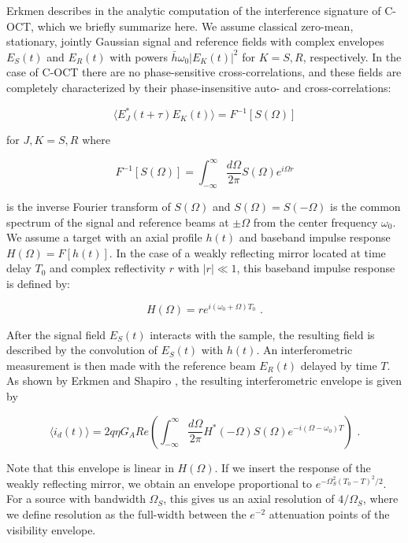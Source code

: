 Erkmen describes in \cite{erkmen-thesis} the analytic computation of the interference signature of C-OCT, which we briefly summarize here. We assume classical zero-mean, stationary, jointly Gaussian signal and reference fields with complex envelopes $E_S(t)$ and $E_R(t)$ with powers $\bar{h}\omega_0|E_K(t)|^2$ for $K = S, R$, respectively. In the case of C-OCT there are no phase-sensitive cross-correlations, and these fields are completely characterized by their phase-insensitive auto- and cross-correlations:

\begin{equation}
\langle E_J^*(t+\tau) E_K(t) \rangle = F^{-1}[S(\Omega)]
\end{equation}

for $J, K = S, R$ where

\begin{equation}
F^{-1}[S(\Omega)] = \int_{-\infty}^{\infty} \frac{d\Omega}{2\pi} S(\Omega) e^{i \Omega r}
\end{equation}

is the inverse Fourier transform of $S(\Omega)$ and $S(\Omega) = S(-\Omega)$ is the common spectrum of the signal and reference beams at $\pm\Omega$ from the center frequency $\omega_0$. We assume a target with an axial profile $h(t)$ and baseband impulse response $H(\Omega) = F[h(t)]$. In the case of a weakly reflecting mirror located at time delay $T_0$ and complex reflectivity $r$ with $|r| \ll 1$, this baseband impulse response is defined by:

\begin{equation}
H(\Omega) = re^{i(\omega_0 + \Omega)T_0}\,\,.
\end{equation}

After the signal field $E_S(t)$ interacts with the sample, the resulting field is described by the convolution of $E_S(t)$ with $h(t)$. An interferometric measurement is then made with the reference beam $E_R(t)$ delayed by time $T$. As shown by Erkmen and Shapiro \cite{erkmen-pcoct}, the resulting interferometric envelope is given by

\begin{equation}
\langle i_d(t) \rangle = 2q\eta G_A Re\left( \int_{-\infty}^{\infty} \frac{d\Omega}{2\pi} H^*(-\Omega) S(\Omega) e^{-i(\Omega-\omega_0)T}   \right)\,\,.
\end{equation}

Note that this envelope is linear in $H(\Omega)$. If we insert the response of the weakly reflecting mirror, we obtain an envelope proportional to $e^{-\Omega_S^2 (T_0 - T)^2 / 2}$. For a source with bandwidth $\Omega_S$, this gives us an axial resolution of $4/\Omega_S$, where we define resolution as the full-width between the $e^{-2}$ attenuation points of the visibility envelope.

